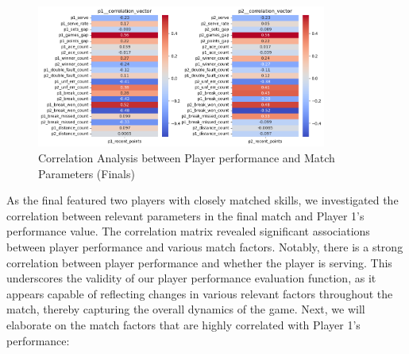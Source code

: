 \documentclass[UTF8]{ctexart} %
\begin{document}
\begin{figure}[H]
    \centering
    \includegraphics[width=0.85\textwidth]{./graph/final_game_relationship.png}
    \caption{Correlation Analysis between Player performance and Match Parameters (Finals)}
\end{figure}

As the final featured two players with closely matched skills, we investigated the correlation 
between relevant parameters in the final match and Player 1's performance value. The correlation 
matrix revealed significant associations between player performance and various match factors. 
Notably, there is a strong correlation between player performance and whether the player is serving. 
This underscores the validity of our player performance evaluation function, as it appears capable 
of reflecting changes in various relevant factors throughout the match, thereby capturing the 
overall dynamics of the game.
Next, we will elaborate on the match factors that are highly correlated with Player 1's performance:
\end{document}
